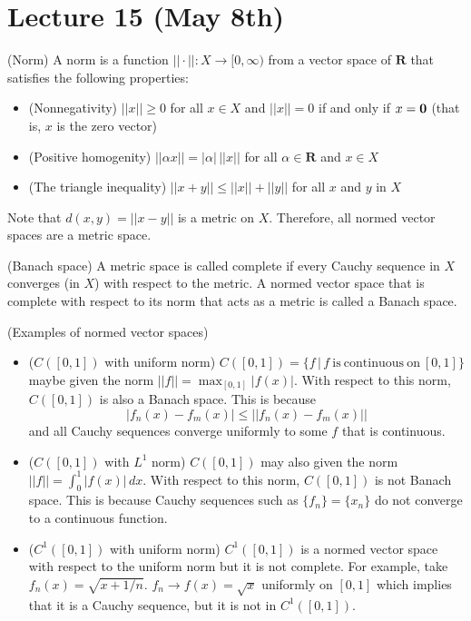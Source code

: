 \section{Lecture 15 (May 8th)}
\begin{defi}
(Norm) A norm is a function $||\cdot ||:X\rightarrow [0,\infty )$ from a vector space of ${\bm R}$ that satisfies the following properties:
\begin{itemize}
\item[(i)] (Nonnegativity) $||x||\geq 0$ for all $x\in X$ and $||x||=0$ if and only if $x={\bf 0}$ (that is, $x$ is the zero vector)
\item[(ii)] (Positive homogenity) $||\alpha x||=|\alpha |\,||x||$ for all $\alpha \in {\bm R}$ and $x\in X$
\item[(iii)] (The triangle inequality) $||x+y||\leq ||x||+||y||$ for all $x$ and $y$ in $X$
\end{itemize}
Note that $d(x,y)=||x-y||$ is a metric on $X$. Therefore, all normed vector spaces are a metric space.
\end{defi}
\vspace{2ex}
\begin{defi}
(Banach space) A metric space is called complete if every Cauchy sequence in $X$ converges (in $X$) with respect to the metric. A normed vector space that is complete with respect to its norm that acts as a metric is called a Banach space.
\end{defi}
\vspace{2ex}
\begin{ex}
(Examples of normed vector spaces) 
\begin{itemize}
\item[(i)] ($C([0,1])$ with uniform norm) $C([0,1])=\{f\,|\,f\mathrm{\ is\ continuous\ on\ }[0,1]\}$ maybe given the norm $||f||=\max_{[0,1]}|f(x)|$. With respect to this norm, $C([0,1])$ is also a Banach space. This is because 
\[|f_{n}(x)-f_{m}(x)|\leq ||f_{n}(x)-f_{m}(x)||\]
and all Cauchy sequences converge uniformly to some $f$ that is continuous. 
\item[(ii)] ($C([0,1])$ with $L^1$ norm) $C([0,1])$ may also given the norm $||f||=\int ^{1}_{0}|f(x)|\,dx$. With respect to this norm, $C([0,1])$ is not Banach space. This is because Cauchy sequences such as  $\{f_{n}\}=\{x_{n}\}$ do not converge to a continuous function.
\item[(iii)] ($C^1([0,1])$ with uniform norm) $C^{1}([0,1])$ is a normed vector space with respect to the uniform norm but it is not complete. For example, take $f_{n}(x)=\sqrt{x+1/n}$. $f_{n}\rightarrow f(x)=\sqrt{x}$ uniformly on $[0,1]$ which implies that it is a Cauchy sequence, but it is not in $C^{1}([0,1])$.
\end{itemize}
\end{ex}
